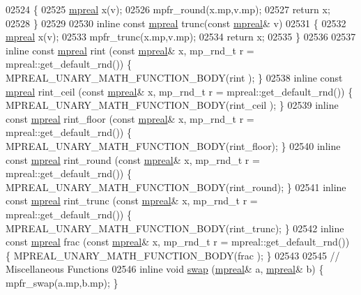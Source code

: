 \begin{DoxyCode}
{{02524 \{
02525     \hyperlink{classmpfr_1_1mpreal}{mpreal} x(v);
02526     mpfr\_round(x.mp,v.mp);
02527     \textcolor{keywordflow}{return} x;
02528 \}
02529 
02530 \textcolor{keyword}{inline} \textcolor{keyword}{const} \hyperlink{classmpfr_1_1mpreal}{mpreal} trunc(\textcolor{keyword}{const} \hyperlink{classmpfr_1_1mpreal}{mpreal}& v)
02531 \{
02532     \hyperlink{classmpfr_1_1mpreal}{mpreal} x(v);
02533     mpfr\_trunc(x.mp,v.mp);
02534     \textcolor{keywordflow}{return} x;
02535 \}
02536 
02537 \textcolor{keyword}{inline} \textcolor{keyword}{const} \hyperlink{classmpfr_1_1mpreal}{mpreal} rint       (\textcolor{keyword}{const} \hyperlink{classmpfr_1_1mpreal}{mpreal}& x, mp\_rnd\_t r = mpreal::get\_default\_rnd()) \{   
      MPREAL\_UNARY\_MATH\_FUNCTION\_BODY(rint      );     \}
02538 \textcolor{keyword}{inline} \textcolor{keyword}{const} \hyperlink{classmpfr_1_1mpreal}{mpreal} rint\_ceil  (\textcolor{keyword}{const} \hyperlink{classmpfr_1_1mpreal}{mpreal}& x, mp\_rnd\_t r = mpreal::get\_default\_rnd()) \{   
      MPREAL\_UNARY\_MATH\_FUNCTION\_BODY(rint\_ceil );     \}
02539 \textcolor{keyword}{inline} \textcolor{keyword}{const} \hyperlink{classmpfr_1_1mpreal}{mpreal} rint\_floor (\textcolor{keyword}{const} \hyperlink{classmpfr_1_1mpreal}{mpreal}& x, mp\_rnd\_t r = mpreal::get\_default\_rnd()) \{   
      MPREAL\_UNARY\_MATH\_FUNCTION\_BODY(rint\_floor);     \}
02540 \textcolor{keyword}{inline} \textcolor{keyword}{const} \hyperlink{classmpfr_1_1mpreal}{mpreal} rint\_round (\textcolor{keyword}{const} \hyperlink{classmpfr_1_1mpreal}{mpreal}& x, mp\_rnd\_t r = mpreal::get\_default\_rnd()) \{   
      MPREAL\_UNARY\_MATH\_FUNCTION\_BODY(rint\_round);     \}
02541 \textcolor{keyword}{inline} \textcolor{keyword}{const} \hyperlink{classmpfr_1_1mpreal}{mpreal} rint\_trunc (\textcolor{keyword}{const} \hyperlink{classmpfr_1_1mpreal}{mpreal}& x, mp\_rnd\_t r = mpreal::get\_default\_rnd()) \{   
      MPREAL\_UNARY\_MATH\_FUNCTION\_BODY(rint\_trunc);     \}
02542 \textcolor{keyword}{inline} \textcolor{keyword}{const} \hyperlink{classmpfr_1_1mpreal}{mpreal} frac       (\textcolor{keyword}{const} \hyperlink{classmpfr_1_1mpreal}{mpreal}& x, mp\_rnd\_t r = mpreal::get\_default\_rnd()) \{   
      MPREAL\_UNARY\_MATH\_FUNCTION\_BODY(frac      );     \}
02543 
02545 \textcolor{comment}{// Miscellaneous Functions}
02546 \textcolor{keyword}{inline} \textcolor{keywordtype}{void}         \hyperlink{endian_8c_a3ca5ecd34b04d6a243c054ac3a57f68d}{swap} (\hyperlink{classmpfr_1_1mpreal}{mpreal}& a, \hyperlink{classmpfr_1_1mpreal}{mpreal}& b)            \{    mpfr\_swap(a.mp,b.mp);   \}
}}
\end{DoxyCode}
